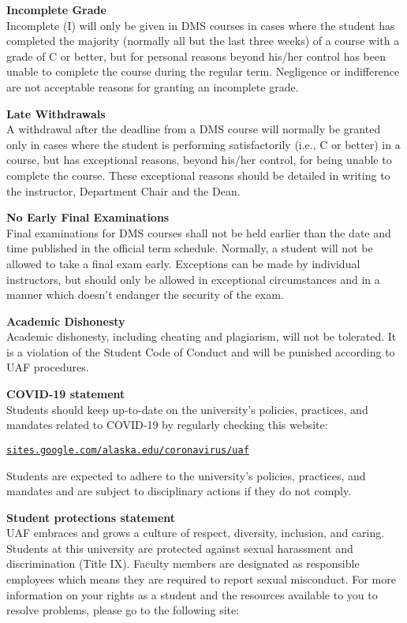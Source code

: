\documentclass[12pt]{article}
\renewcommand{\emph}[1]{\textsf{\textbf{#1}}}
\newcommand{\localhead}[1]{\par\smallskip\textbf{#1} \smallskip\nobreak\\}%
\def\subheading#1{\localhead{\emph{#1}}}
\begin{document}
\subheading{Incomplete Grade} 
Incomplete (I) will only be given in
  DMS courses in cases where
  the student has completed the majority (normally all but the last
  three weeks) of a course with a grade of C or better, but for
  personal reasons beyond his/her control has been unable to complete
  the course during the regular term. Negligence or indifference are
  not acceptable reasons for granting an incomplete grade.

\subheading{Late Withdrawals} 
A withdrawal after the deadline from a DMS course will
  normally be granted only in cases where the student is performing
  satisfactorily (i.e., C or better) in a course, but has exceptional
  reasons, beyond his/her control, for being unable to complete the
  course.  These exceptional reasons should be detailed in writing to
  the instructor, Department Chair and the Dean.

\subheading{No Early Final Examinations}
Final examinations for DMS
  courses shall not be held earlier than the date and time published
  in the official term schedule. Normally, a student will not be
  allowed to take a final exam early. Exceptions can be made by
  individual instructors, but should only be allowed in exceptional
  circumstances and in a manner which doesn't endanger the security of
  the exam.

\subheading{Academic Dishonesty}
Academic dishonesty, including cheating and plagiarism, will not
be tolerated.  It is a violation of the Student Code of Conduct
and will be punished according to UAF procedures.
 
\subheading{COVID-19 statement}
Students should keep up-to-date on the university's policies, practices, and mandates related to COVID-19 by regularly checking this website:

\href{https://sites.google.com/alaska.edu/coronavirus/uaf?authuser=0}{\texttt{sites.google.com/alaska.edu/coronavirus/uaf}}

Students are expected to adhere to the university's policies, practices, and mandates and are subject to disciplinary actions if they do not comply.

\subheading{Student protections statement}
UAF embraces and grows a culture of respect, diversity, inclusion, and caring. Students at this university are protected against sexual harassment and discrimination (Title IX). Faculty members are designated as responsible employees which means they are required to report sexual misconduct. For more information on your rights as a student and the resources available to you to resolve problems, please go to the following site:
\end{document}
